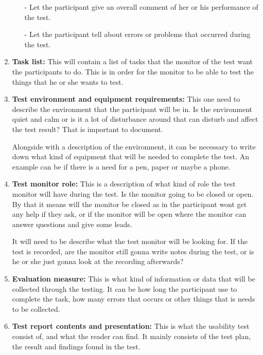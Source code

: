 \begin{enumerate}
\begin{enumerate}
  - Let the participant give an overall comment of her or his performance of the test.
  
  - Let the participant tell about errors or problems that occurred during the test.
  
  \end{enumerate}
  \item \textbf{Task list:} This will contain a list of tasks that the monitor of the test want the participants to do. This is in order for the monitor to be able to test the things that he or she wants to test.
  
  \item \textbf{Test environment and equipment requirements:} This one need to describe the environment that the participant will be in. Is the environment quiet and calm or is it a lot of disturbance around that can disturb and affect the test result? That is important to document.
  
  Alongside with a description of the environment, it can be necessary to write down what kind of equipment that will be needed to complete the test. An example can be if there is a need for a pen, paper or maybe a phone. 
  
  \item \textbf{Test monitor role:} This is a description of what kind of role the test monitor will have during the test. Is the monitor going to be closed or open. By that it means will the monitor be closed as in the participant wont get any help if they ask, or if the monitor will be open where the monitor can answer questions and give some leads.
  
  It will need to be describe what the test monitor will be looking for. If the test is recorded, are the monitor still gonna write notes during the test, or is he or she just gonna look at the recording afterwards?  
  
  \item \textbf{Evaluation measure:} This is what kind of information or data that will be collected through the testing. It can be how long the participant use to complete the task, how many errors that occurs or other things that is needs to be collected.

  \item \textbf{Test report contents and presentation:} This is what the usability test consist of, and what the reader can find. It mainly consists of the test plan, the result and findings found in the test.
\end{enumerate}

